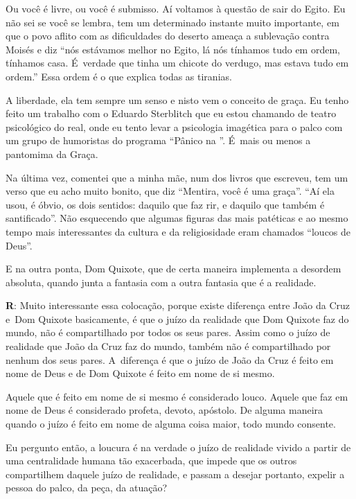  

Ou você é livre, ou você é submisso. Aí voltamos à questão de sair do
Egito. Eu não sei se você se lembra, tem um determinado instante muito
importante, em que o povo aflito com as dificuldades do deserto ameaça a
sublevação contra Moisés e diz ``nós estávamos melhor no Egito, lá nós
tínhamos tudo em ordem, tínhamos casa. É~verdade que tinha um chicote do
verdugo, mas estava tudo em ordem.'' Essa ordem é o que explica todas as
tiranias.

 

A liberdade, ela tem sempre um senso e nisto vem o conceito de graça. Eu
tenho feito um trabalho com o Eduardo Sterblitch que eu estou chamando
de teatro psicológico do real, onde eu tento levar a psicologia
imagética para o palco com um grupo de humoristas do programa ``Pânico
na ''. É~mais ou menos a pantomima da Graça.

 

Na última vez, comentei que a minha mãe, num dos livros que escreveu,
tem um verso que eu acho muito bonito, que diz ``Mentira, você é uma
graça''. ``Aí ela usou, é óbvio, os dois sentidos: daquilo que faz rir,
e daquilo que também é santificado''. Não esquecendo que algumas figuras
das mais patéticas e ao mesmo tempo mais interessantes da cultura e da
religiosidade eram chamados ``loucos de Deus''.

 

E na outra ponta, Dom Quixote, que de certa maneira implementa a
desordem absoluta, quando junta a fantasia com a outra fantasia que é a
realidade.

 

\textbf{R}: Muito interessante essa colocação, porque existe diferença
entre João da Cruz e\textbf{}~Dom Quixote basicamente, é que o juízo da
realidade que Dom Quixote faz do mundo, não é compartilhado por todos os
seus pares. Assim como o juízo de realidade que João da Cruz faz do
mundo, também não é compartilhado por nenhum dos seus pares. A~diferença
é que o juízo de João da Cruz é feito em nome de Deus e de Dom Quixote é
feito em nome de si mesmo.

 

Aquele que é feito em nome de si mesmo é considerado louco. Aquele que
faz em nome de Deus é considerado profeta, devoto, apóstolo. De alguma
maneira quando o juízo é feito em nome de alguma coisa maior, todo mundo
consente.

 

Eu pergunto então, a loucura é na verdade o juízo de realidade vivido a
partir de uma centralidade humana tão exacerbada, que impede que os
outros compartilhem daquele juízo de realidade, e passam a desejar
portanto, expelir a pessoa do palco, da peça, da atuação?

